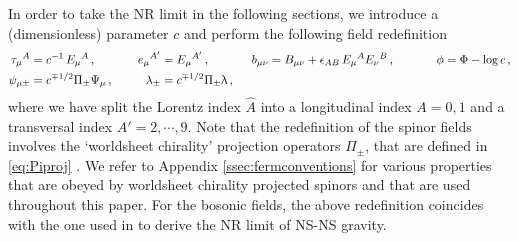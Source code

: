 \documentclass[a4paper,10pt,openany]{article}
\begin{document}
	In order to take the NR limit in the following sections, we introduce a (dimensionless) parameter $c$ and perform the following field redefinition
	\begin{alignat}{4}\label{eq:rescale}
		\tau_\mu{}^A &= c^{-1}\,E_\mu{}^A\,, \qquad \ \ & e_\mu{}^{A'} &= E_\mu{}^{A'}\,, \qquad \ \ & b_{\mu\nu} &= B_{\mu\nu}+\epsilon_{AB}\,E_\mu{}^A E_\nu{}^B\,, \qquad \ \ & \phi &= \Phi - \log c\,,\notag\\
		\psi_{\mu\pm} &= c^{\mp 1/2}\Pi_{\pm}\Psi_\mu\,,& \lambda_\pm &= c^{\mp 1/2}\Pi_\pm\uplambda\,,
	\end{alignat}
	where we have split the Lorentz index $\hat{A}$ into a longitudinal index $A=0,1$ and a transversal index $A'=2,\cdots,9$. Note that the redefinition of the spinor fields involves the `worldsheet chirality' projection operators $\Pi_\pm$, that are defined in \eqref{eq:Piproj} \cite{Gomis:2004pw}. We refer to Appendix \ref{ssec:fermconventions} for various properties that are obeyed by worldsheet chirality projected spinors and that are used throughout this paper. For the bosonic fields, the above redefinition coincides with the one used in \cite{Bergshoeff:2021bmc} to derive the NR limit of NS-NS gravity.
	
\end{document}
